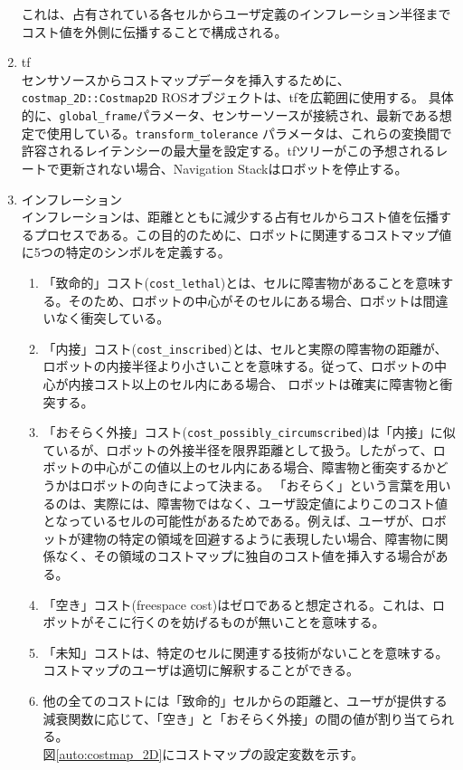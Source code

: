 \begin{enumerate}
  これは、占有されている各セルからユーザ定義のインフレーション半径までコスト値を外側に伝播することで構成される。
  \item tf\\
  センサソースからコストマップデータを挿入するために、\verb|costmap_2D::Costmap2D| ROSオブジェクトは、tfを広範囲に使用する。
  具体的に、\verb|global_frame|パラメータ、センサーソースが接続され、最新である想定で使用している。\verb|transform_tolerance|
  パラメータは、これらの変換間で許容されるレイテンシーの最大量を設定する。tfツリーがこの予想されるレートで更新されない場合、Navigation Stackはロボットを停止する。
  \item インフレーション\\
  インフレーションは、距離とともに減少する占有セルからコスト値を伝播するプロセスである。この目的のために、ロボットに関連するコストマップ値に5つの特定のシンボルを定義する。
  \begin{enumerate}
    \item 「致命的」コスト(\verb|cost_lethal|)とは、セルに障害物があることを意味する。そのため、ロボットの中心がそのセルにある場合、ロボットは間違いなく衝突している。
    \item 「内接」コスト(\verb|cost_inscribed|)とは、セルと実際の障害物の距離が、ロボットの内接半径より小さいことを意味する。従って、ロボットの中心が内接コスト以上のセル内にある場合、
    ロボットは確実に障害物と衝突する。
    \item 「おそらく外接」コスト(\verb|cost_possibly_circumscribed|)は「内接」に似ているが、ロボットの外接半径を限界距離として扱う。したがって、ロボットの中心がこの値以上のセル内にある場合、障害物と衝突するかどうかはロボットの向きによって決まる。
    「おそらく」という言葉を用いるのは、実際には、障害物ではなく、ユーザ設定値によりこのコスト値となっているセルの可能性があるためである。例えば、ユーザが、ロボットが建物の特定の領域を回避するように表現したい場合、障害物に関係なく、その領域のコストマップに独自のコスト値を挿入する場合がある。
    \item 「空き」コスト(freespace cost)はゼロであると想定される。これは、ロボットがそこに行くのを妨げるものが無いことを意味する。
    \item 「未知」コストは、特定のセルに関連する技術がないことを意味する。コストマップのユーザは適切に解釈することができる。
    \item 他の全てのコストには「致命的」セルからの距離と、ユーザが提供する減衰関数に応じて、「空き」と「おそらく外接」の間の値が割り当てられる。
    \\図\ref{auto:costmap_2D}にコストマップの設定変数を示す。

\end{enumerate}
\end{enumerate}
